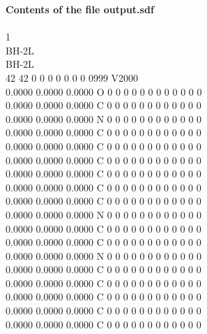\documentclass[11pt,titlepage,dvipdfmx,twoside]{article}
\begin{document}
\begin{oframed}
{\bf Contents of the file output.sdf}\\\\
{1																		\\
BH-2L                                                                   \\
BH-2L                                                                   \\
 42 42  0  0  0  0  0  0  0  0999 V2000                                 \\
    0.0000    0.0000    0.0000  O  0  0  0  0  0  0  0  0  0  0  0  0   \\
    0.0000    0.0000    0.0000  C  0  0  0  0  0  0  0  0  0  0  0  0   \\
    0.0000    0.0000    0.0000  N  0  0  0  0  0  0  0  0  0  0  0  0   \\
    0.0000    0.0000    0.0000  C  0  0  0  0  0  0  0  0  0  0  0  0   \\
    0.0000    0.0000    0.0000  C  0  0  0  0  0  0  0  0  0  0  0  0   \\
    0.0000    0.0000    0.0000  C  0  0  0  0  0  0  0  0  0  0  0  0   \\
    0.0000    0.0000    0.0000  C  0  0  0  0  0  0  0  0  0  0  0  0   \\
    0.0000    0.0000    0.0000  C  0  0  0  0  0  0  0  0  0  0  0  0   \\
    0.0000    0.0000    0.0000  C  0  0  0  0  0  0  0  0  0  0  0  0   \\
    0.0000    0.0000    0.0000  N  0  0  0  0  0  0  0  0  0  0  0  0   \\
    0.0000    0.0000    0.0000  C  0  0  0  0  0  0  0  0  0  0  0  0   \\
    0.0000    0.0000    0.0000  C  0  0  0  0  0  0  0  0  0  0  0  0   \\
    0.0000    0.0000    0.0000  N  0  0  0  0  0  0  0  0  0  0  0  0   \\
    0.0000    0.0000    0.0000  C  0  0  0  0  0  0  0  0  0  0  0  0   \\
    0.0000    0.0000    0.0000  C  0  0  0  0  0  0  0  0  0  0  0  0   \\
    0.0000    0.0000    0.0000  C  0  0  0  0  0  0  0  0  0  0  0  0   \\
    0.0000    0.0000    0.0000  C  0  0  0  0  0  0  0  0  0  0  0  0   \\
    0.0000    0.0000    0.0000  C  0  0  0  0  0  0  0  0  0  0  0  0   \\
}
\end{oframed}
\end{document}
